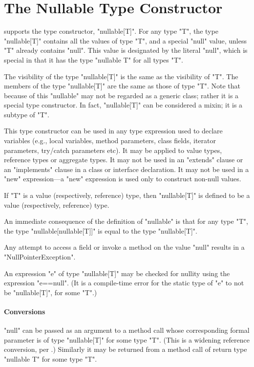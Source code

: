 \section{The Nullable Type Constructor}
\label{NullableTypeConstructor}

\Xten{} supports the type constructor, \xcd"nullable[T]".  For any
type \xcd"T", the type \xcd"nullable[T]" contains all the values of
type \xcd"T", and a special \xcd"null" value, unless \xcd"T" already
contains \xcd"null". This value is designated by the literal
\xcd"null", which is special in that it has the type
\xcd"nullable T" for all types \xcd"T".

The visibility of the type \xcd"nullable[T]" is the same as the
visibility of \xcd"T". The members of the type \xcd"nullable[T]" are
the same as those of type \xcd"T". Note that because of this
\xcd"nullable" may not be regarded as a generic class; rather it is a
special type constructor.  In fact, \xcd"nullable[T]" can be
considered a mixin; it is a subtype of \xcd"T".


This type constructor can be used in any type expression used to
declare variables (e.g., local variable{s}, method parameter{s},
class field{s}, iterator parameter{s}, try/catch parameter{s} etc).
It may be applied to value types, reference types or aggregate types.
It may not be used in an \xcd"extends" clause or an \xcd"implements"
clause in a class or interface declaration. It may not be used 
in a \xcd"new" expression---a \xcd"new" expression is used only to construct 
non-null values.

If \xcd"T" is a value
(respectively, reference) type, then \xcd"nullable[T]" is defined to be
a value (respectively, reference) type.

An immediate consequence of the definition of \xcd"nullable" is that
for any type \xcd"T", the type \xcd"nullable[nullable[T]]" is equal to
the type \xcd"nullable[T]".

Any attempt to access a field or invoke a method on the value
\xcd"null" results in a \xcd"NullPointerException".

An expression \xcd"e" of type \xcd"nullable[T]" may be checked for nullity
using the expression \xcd"e==null". (It is a compile-time error for
the static type of \xcd"e" to not be \xcd"nullable[T]", for some \xcd"T".)

\paragraph{Conversions}
\xcd"null" can be passed as an argument to a method call whose
corresponding formal parameter is of type \xcd"nullable[T]" for some type
\xcd"T". (This is a widening reference conversion, per \cite[Sec
5.1.4]{jls2}.) Similarly it may be returned from a method call of
return type \xcd"nullable T" for some type \xcd"T".

